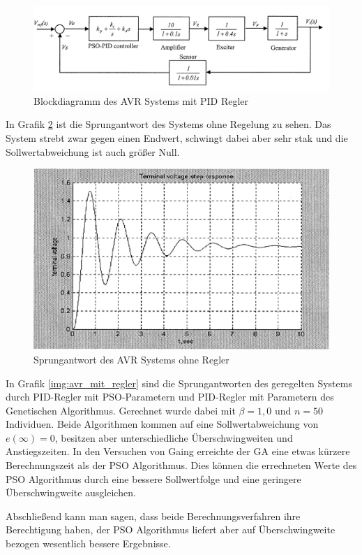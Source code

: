 \begin{figure}[hbtp]
    \centering
    \includegraphics[width=0.8\linewidth]{images/avr_system}
    \caption{Blockdiagramm des AVR Systems mit PID Regler}
    \label{img:avr_sys}
\end{figure}

In Grafik \ref{img:avr_ohne_regler} ist die Sprungantwort des Systems ohne Regelung zu sehen. Das System strebt zwar gegen einen Endwert, schwingt dabei aber sehr stak und die Sollwertabweichung ist auch gr\"o\ss er Null.
\begin{figure}[hbtp]
    \centering
    \includegraphics[width=0.8\linewidth]{images/avr_ohne_regler}
    \caption{Sprungantwort des AVR Systems ohne Regler}
    \label{img:avr_ohne_regler}
\end{figure}

In Grafik \ref{img:avr_mit_regler} sind die Sprungantworten des geregelten
Systems durch PID-Regler mit PSO-Parametern und PID-Regler mit Parametern des
Genetischen Algorithmus. Gerechnet wurde dabei mit $\beta = 1,0$ und $n=50$
Individuen. Beide Algorithmen kommen auf eine Sollwertabweichung von
$e(\infty)=0$, besitzen aber unterschiedliche \"Uberschwingweiten und
Anstiegszeiten. In den Versuchen von Gaing erreichte der GA eine etwas k\"urzere
Berechnungszeit als der PSO Algorithmus. Dies k\"onnen die errechneten Werte des
PSO Algorithmus durch eine bessere Sollwertfolge und eine geringere
\"Uberschwingweite ausgleichen.

Abschlie\ss end kann man sagen, dass beide Berechnungsverfahren ihre
Berechtigung haben, der PSO Algorithmus liefert aber auf \"Uberschwingweite
bezogen wesentlich bessere Ergebnisse.

